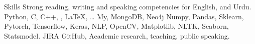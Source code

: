 
\begin{rubric}{Skills}
\entry*[Languages]
	Strong reading, writing and speaking competencies for English, and Urdu.
	Python, C, C++, , \LaTeX, \ldots
\entry*[Databases]
	My, MongoDB, Neo4j
	Numpy, Pandas, Sklearn, Pytorch, Tensorflow, Keras, NLP, OpenCV, Matplotlib, NLTK, Seaborn, Statsmodel.
	JIRA
\entry*[Misc]
	GitHub, Academic research, teaching, public speaking.
\end{rubric}
